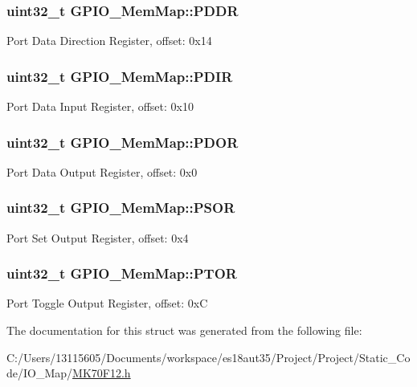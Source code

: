 \subsubsection[{P\+D\+D\+R}]{\setlength{\rightskip}{0pt plus 5cm}uint32\+\_\+t G\+P\+I\+O\+\_\+\+Mem\+Map\+::\+P\+D\+D\+R}\label{struct_g_p_i_o___mem_map_a49dfaa95d08fa9178dd7f098c87f562d}
Port Data Direction Register, offset\+: 0x14 \hypertarget{struct_g_p_i_o___mem_map_a01933bea5d005bf126ea2e0345518763}{}
\subsubsection[{P\+D\+I\+R}]{\setlength{\rightskip}{0pt plus 5cm}uint32\+\_\+t G\+P\+I\+O\+\_\+\+Mem\+Map\+::\+P\+D\+I\+R}\label{struct_g_p_i_o___mem_map_a01933bea5d005bf126ea2e0345518763}
Port Data Input Register, offset\+: 0x10 \hypertarget{struct_g_p_i_o___mem_map_aaf4f486952b9b4680e270ce6266122fd}{}
\subsubsection[{P\+D\+O\+R}]{\setlength{\rightskip}{0pt plus 5cm}uint32\+\_\+t G\+P\+I\+O\+\_\+\+Mem\+Map\+::\+P\+D\+O\+R}\label{struct_g_p_i_o___mem_map_aaf4f486952b9b4680e270ce6266122fd}
Port Data Output Register, offset\+: 0x0 \hypertarget{struct_g_p_i_o___mem_map_a14833f065ec123137ccce5ab873b5879}{}
\subsubsection[{P\+S\+O\+R}]{\setlength{\rightskip}{0pt plus 5cm}uint32\+\_\+t G\+P\+I\+O\+\_\+\+Mem\+Map\+::\+P\+S\+O\+R}\label{struct_g_p_i_o___mem_map_a14833f065ec123137ccce5ab873b5879}
Port Set Output Register, offset\+: 0x4 \hypertarget{struct_g_p_i_o___mem_map_a03faa882b5f4554ff4c11954c2d8759b}{}
\subsubsection[{P\+T\+O\+R}]{\setlength{\rightskip}{0pt plus 5cm}uint32\+\_\+t G\+P\+I\+O\+\_\+\+Mem\+Map\+::\+P\+T\+O\+R}\label{struct_g_p_i_o___mem_map_a03faa882b5f4554ff4c11954c2d8759b}
Port Toggle Output Register, offset\+: 0x\+C 

The documentation for this struct was generated from the following file\+:\begin{DoxyCompactItemize}
\item 
C\+:/\+Users/13115605/\+Documents/workspace/es18aut35/\+Project/\+Project/\+Static\+\_\+\+Code/\+I\+O\+\_\+\+Map/\hyperlink{_m_k70_f12_8h}{M\+K70\+F12.\+h}\end{DoxyCompactItemize}
